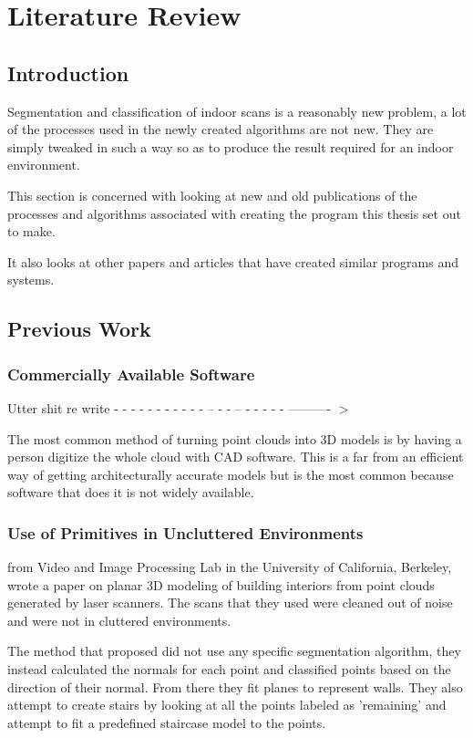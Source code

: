 \chapter{Literature Review}

\section{Introduction}
	Segmentation and classification of indoor scans is a reasonably new problem, a lot of the processes used in the newly created algorithms are not new. They are simply tweaked in such a way so as to produce the result required for an indoor environment. 
	
	This section is concerned with looking at new and old publications of the processes and algorithms associated with creating the program this thesis set out to make.
	
	It also looks at other papers and articles that have created similar programs and systems.
	
\section{Previous Work}

	\subsection{Commercially Available Software}
		Utter shit re write - - - - - -  - - - - - --  - - -- - - - - - ---------- $>$
	
		The most common method of turning point clouds into 3D models is by having a person digitize the whole cloud with CAD software. This is a far from an efficient way of getting architecturally accurate models but is the most common because software that does it is not widely available. 
		

	\subsection{Use of Primitives in Uncluttered Environments}
		\cite{sanchez_planar_2012} from Video and Image Processing Lab in the University of California, Berkeley, wrote a paper on planar 3D modeling of building interiors from point clouds generated by laser scanners. The scans that they used were cleaned out of noise and were not in cluttered environments.
		
		The method that \citeauthor{sanchez_planar_2012} proposed did not use any specific segmentation algorithm, they instead calculated the normals for each point and classified points based on the direction of their normal. From there they fit planes to represent walls. They also attempt to create stairs by looking at all the points labeled as 'remaining' and attempt to fit a predefined staircase model to the points.
		
